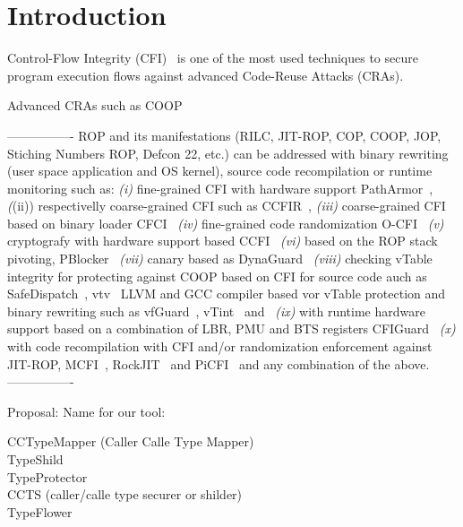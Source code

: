 \chapter{Introduction}
\label{chapter:Introduction}
Control-Flow Integrity (CFI)~\cite{abadi:cfi, abadi:cfi2} is one of the most used techniques
to secure program execution flows against advanced Code-Reuse Attacks (CRAs).

Advanced CRAs such as COOP~\cite{schuster:coop}


 ----------------
 ROP and its manifestations (RILC, JIT-ROP, COP, COOP, JOP, Stiching Numbers ROP, Defcon 22, etc.) 
can be addressed with binary rewriting (user space application and OS kernel),
source code recompilation or runtime monitoring such as: 
\textit{(i)} fine-grained CFI with hardware support PathArmor~\cite{veen:cfi},
\textit((ii)) respectivelly coarse-grained CFI such as CCFIR~\cite{ccfir:zhang},
\textit{(iii)} coarse-grained CFI based on binary loader CFCI~\cite{cfci:zhang}
\textit{(iv)} fine-grained code randomization O-CFI~\cite{mohan:opaque}
\textit{(v)} cryptografy with hardware support based CCFI~\cite{ccfi:jose}
\textit{(vi)} based on the ROP stack pivoting, PBlocker~\cite{pblocker:prakash}
\textit{(vii)} canary based as DynaGuard~\cite{dynaguard:petsios}
\textit{(viii)} checking vTable integrity for protecting against COOP based on CFI for source code auch as SafeDispatch~\cite{safedispatch:jang}, 
vtv~\cite{vtv:tice} LLVM and GCC compiler based vor vTable protection 
and binary rewriting such as vfGuard~\cite{vfuard:aravind}, vTint~\cite{vtint:zhang} and~\cite{trap:crane}
\textit{(ix)} with runtime hardware support based on a combination of LBR, PMU and BTS registers CFIGuard~\cite{cfiguard:yuan}
\textit{(x)} with code recompilation with CFI and/or randomization enforcement against 
JIT-ROP, MCFI~\cite{mcfi:niu}, RockJIT~\cite{rockjit:niu} and PiCFI~\cite{perinput:niu}
and any combination of the above.
 ----------------


Proposal: Name for our tool: 

CCTypeMapper (Caller Calle Type Mapper) \\ 
 
TypeShild \\ 
 
TypeProtector \\ 

CCTS (caller/calle type securer or shilder) \\ 

TypeFlower \\ 

